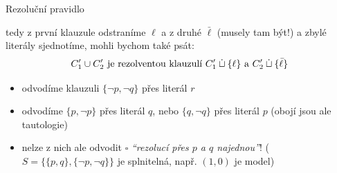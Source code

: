\documentclass{beamer}
\begin{document}
\begin{frame}{Rezoluční pravidlo}    
    
    
    \pause
    tedy z první klauzule odstraníme $\ell$ a z druhé $\bar\ell$ (musely tam být!) a zbylé literály sjednotíme, mohli bychom také psát:\pause
    $$
    C_1'\mathbin{\cup} C_2'\text{ je rezolventou klauzulí }C_1'\mathbin{\dot{\sqcup}}\{\ell\}\text{ a }C_2'\mathbin{\dot{\sqcup}}\{\bar \ell\}
    $$
    \pause
    \vspace{-12pt}
    \begin{itemize}
        \item {}
        odvodíme klauzuli $\{\neg p,\neg q\}$ přes literál $r$\pause
        \item {}
        odvodíme $\{p,\neg p\}$ přes literál $q$, nebo $\{q,\neg q\}$ přes literál $p$ (obojí jsou ale tautologie)\pause
        
        \item nelze z nich ale odvodit $\square$ \emph{``rezolucí přes $p$ a $q$ najednou''}! ($S=\{\{p,q\},\{\neg p,\neg q\}\}$ je splnitelná, např. $(1,0)$ je model)
    \end{itemize}

\end{frame}
\end{document}
